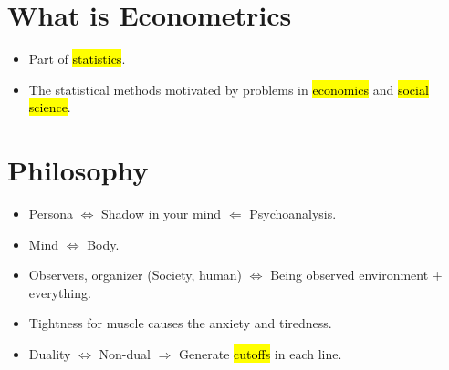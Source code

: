 \documentclass{Theme}
\date{Nov. 3, 2022}
\begin{document}
\ujtitle
\section{What is Econometrics}
\begin{itemize}
    \item Part of \hl{statistics}.
    \item The statistical methods motivated by problems
    in \hl{economics} and \hl{social science}.
\end{itemize}

\section{Philosophy}
\begin{itemize}
    \item Persona $\iff$ Shadow in your mind $\Leftarrow$ Psychoanalysis.
    \item Mind $\iff$ Body.
    \item Observers, organizer (Society, human) $\iff$ Being observed environment + everything.
    \item Tightness for muscle causes the 
    anxiety and tiredness.
    \item Duality $\iff$ Non-dual $\Rightarrow$
    Generate \hl{cutoffs} in each line.
\end{itemize}
\end{document}
